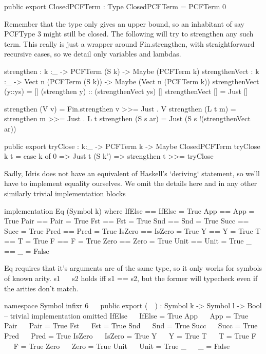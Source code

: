 \begin{code}
public export
ClosedPCFTerm : Type
ClosedPCFTerm = PCFTerm 0
\end{code}

Remember that the type only gives an upper bound, so an inhabitant of say PCFType 3 might still
be closed. The following will try to strengthen any such term.
This really is just a wrapper around Fin.strengthen, with straightforward recursive cases, so we
detail only variables and lambdas.

\begin{code}
strengthen : {k :_} -> PCFTerm (S k) -> Maybe (PCFTerm k)
strengthenVect : {k :_} -> Vect n (PCFTerm (S k)) -> Maybe (Vect n (PCFTerm k))
strengthenVect (y::ys) = [| (strengthen y) :: (strengthenVect ys) |]
strengthenVect [] = Just []
\end{code}

\begin{code}
strengthen (V v)    = Fin.strengthen v >>= Just . V
strengthen (L t m)  = strengthen m     >>= Just . L t
strengthen (S s ar) = Just (S s !(strengthenVect ar))
\end{code}

\begin{code}
public export
tryClose : {k:_} -> PCFTerm k -> Maybe ClosedPCFTerm
tryClose {k} t = case k of
                 0      => Just t
                 (S k') => strengthen t >>= tryClose
\end{code}

Sadly, Idris does not have an equivalent of Haskell's `deriving` statement, so we'll have to
implement equality ourselves. We omit the details here and in any other similarly trivial
implementation blocks

\begin{hidden}
implementation Eq (Symbol k) where
  IfElse == IfElse = True
  App    == App    = True
  Pair   == Pair   = True
  Fst    == Fst    = True
  Snd    == Snd    = True
  Succ   == Succ   = True
  Pred   == Pred   = True
  IsZero == IsZero = True
  Y      == Y      = True
  T      == T      = True
  F      == F      = True
  Zero   == Zero   = True
  Unit   == Unit   = True
  _      == _      = False
\end{hidden}

Eq requires that it's arguments are of the same type, so it only works for symbols of known arity.
s1 ~~ s2 holds iff s1 == s2, but the former will typecheck even if the arities don't match.

\begin{code}
namespace Symbol
  infixr 6 ~~
  public export
  (~~) : Symbol k -> Symbol l -> Bool
  -- trivial implementation omitted
  IfElse ~~ IfElse = True
  App    ~~ App    = True
  Pair   ~~ Pair   = True
  Fst    ~~ Fst    = True
  Snd    ~~ Snd    = True
  Succ   ~~ Succ   = True
  Pred   ~~ Pred   = True
  IsZero ~~ IsZero = True
  Y      ~~ Y      = True
  T      ~~ T      = True
  F      ~~ F      = True
  Zero   ~~ Zero   = True
  Unit   ~~ Unit   = True
  _      ~~ _      = False
\end{code}

